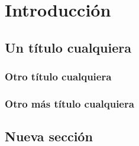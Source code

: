 
\chapter{Introducción}
\label{ch:introduccion}

\lipsum[1]

\section{Un título cualquiera}

\lipsum[1]

\subsection{Otro título cualquiera}

\lipsum[2-4]

\subsection{Otro más título cualquiera}

\lipsum[5-6]

\section{Nueva sección}

\lipsum[1-3]

